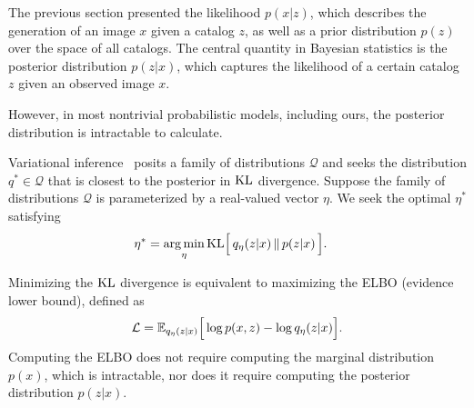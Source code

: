 The previous section presented the likelihood $p(x | z)$, which describes the generation of an image $x$ given a catalog $z$, as well as a prior distribution $p(z)$ over the space of all catalogs. 
The central quantity in Bayesian statistics is the posterior distribution $p(z|x)$, which captures the likelihood of a certain catalog $z$ given 
an observed image $x$. 

However, in most
nontrivial probabilistic models, including ours, the posterior distribution is intractable to calculate.

Variational inference~\cite{Blei_2017_vi_review, Jordan_intro_vi, Wainwrite_graph_models_vi}
posits a family of distributions $\mathcal{Q}$ and seeks
the distribution $q^*\in \mathcal{Q}$ that is closest to the posterior
in $\textrm{KL}$ divergence. Suppose the family of distributions $\mathcal{Q}$ is parameterized by a real-valued vector $\eta$. We seek the optimal $\eta^*$ 
satisfying
\begin{align}
   \eta^* &= \operatorname*{arg\,min}_{\eta} \mathrm{KL}\Big[\,q_\eta(z | x)\, \| \,p(z | x )\,\Big].
   \label{eq:kl_objective}
\end{align}

Minimizing the $\textrm{KL}$ divergence is equivalent to maximizing the ELBO (evidence lower bound), defined as 
\begin{align}
    \mathcal{L} = 
    \mathbb{E}_{q_\eta(z | x)}\Big[\log p(x, z) - \log q_\eta(z | x)\Big].
    \label{eq:elbo}
\end{align}
Computing the ELBO does not require computing the marginal distribution $p(x)$, which is intractable, nor does it
require computing the posterior distribution $p(z | x)$.

